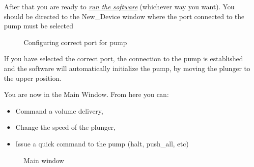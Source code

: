 \documentclass[letterpaper,10pt,english]{sphinxmanual}
\begin{document}
After that you are ready to {\hyperref[installation:running-it]{\emph{run the software}}} (whichever way you want). You should be directed to the New\_Device window where the
port connected to the pump must be selected
\begin{figure}[htbp]
\centering
\capstart

\caption{Configuring correct port for pump}\end{figure}

If you have selected the correct port, the connection to the pump is established and
the software will automatically initialize the pump, by moving the plunger to the upper position.

You are now in the Main Window. From here you can:
\begin{itemize}
\item {} 
Command a volume delivery,

\item {} 
Change the speed of the plunger,

\item {} 
Issue a quick command to the pump (halt, push\_all, etc)

\end{itemize}
\begin{figure}[htbp]
\centering
\capstart

\caption{Main window}\end{figure}
\end{document}
